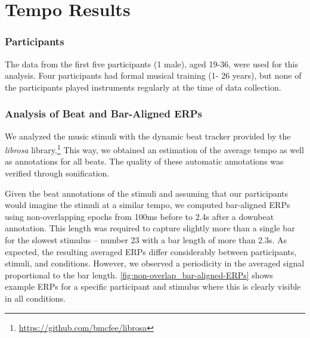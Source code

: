 \chapter*{Tempo Results}
\subsection*{Participants}
The data from the first five participants (1 male), aged 19-36, were used for this analysis. Four participants had formal musical training (1- 26 years), but none of the participants played instruments regularly at the time of data collection.

\subsection*{Analysis of Beat and Bar-Aligned ERPs}

We analyzed the music stimuli with the dynamic beat tracker \cite{ellis_beat_2007} provided by the \emph{librosa} library.\footnote{%
\url{https://github.com/bmcfee/librosa}}
This way, we obtained an estimation of the average tempo as well as annotations for all beats. %
The quality of these automatic annotations was verified through sonification.

Given the beat annotations of the stimuli and assuming that our participants would imagine the stimuli at a similar tempo, 
we computed bar-aligned ERPs using non-overlapping epochs from 100ms before to 2.4s after a downbeat annotation.
This length was required to capture slightly more than a single bar for the slowest stimulus -- number 23 with a bar length of more than 2.3s.
As expected, the resulting averaged ERPs differ considerably between participants, stimuli, and conditions.
However, we observed a periodicity in the averaged signal proportional to the bar length.
%
\autoref{fig:non-overlap_bar-aligned-ERPs} shows example ERPs 
for a specific participant and stimulus where this is clearly visible in all conditions.

